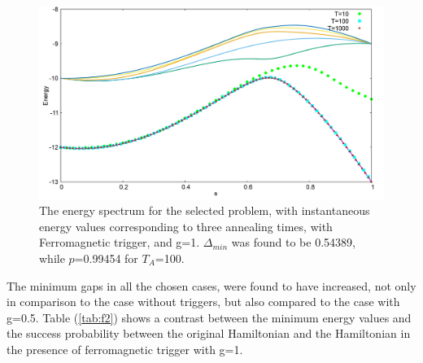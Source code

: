 \documentclass[12]{article}
\begin{document}
\begin{figure}[H]
\centering 
\includegraphics[scale=0.3]{528_s12_F_g1.png}
\caption{The energy spectrum for the selected problem, with instantaneous energy values corresponding to three annealing times, with Ferromagnetic trigger, and g=1. $\Delta_{min}$ was found to be 0.54389, while $p$=0.99454 for $T_A$=100.}
\label{fig:f10}
\end{figure}
The minimum gaps in all the chosen cases, were found to have increased, not only in comparison to the case without triggers, but also compared to the case with g=0.5. Table (\ref{tab:f2}) shows a contrast between the minimum energy values and the success probability between the original Hamiltonian and the Hamiltonian in the presence of ferromagnetic trigger with g=1. 

\begin{table}[H]
  \centering
  \renewcommand{\arraystretch}{1.2}
  \caption{A comparison of the minimum gap and the success probability at $T_A$=100 for the chosen cases, in the absence (represented with a superscript O for Original) and presence (represented with a superscript F for Ferromagnetic) trigger, with strength g=1. In all the chosen cases the gaps increase upon adding the ferromagnetic trigger, thereby improving the success probability.}
  \label{tab:f2}
\end{table}
\end{document}
